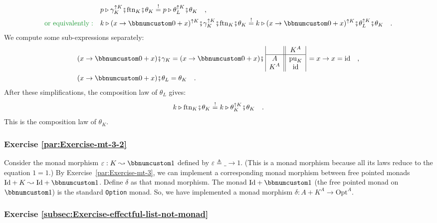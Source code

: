 \begin{align*}
 & p\triangleright\gamma_{K}^{\uparrow K}\bef\text{ftn}_{K}\bef\theta_{K}\overset{!}{=}p\triangleright\theta_{L}^{\uparrow K}\bef\theta_{K}\quad,\\
{\color{greenunder}\text{or equivalently}:}\quad & k\triangleright(x\rightarrow\bbnum 0+x)^{\uparrow K}\bef\gamma_{K}^{\uparrow K}\bef\text{ftn}_{K}\bef\theta_{K}\overset{!}{=}k\triangleright(x\rightarrow\bbnum 0+x)^{\uparrow K}\bef\theta_{L}^{\uparrow K}\bef\theta_{K}\quad.
\end{align*}
We compute some sub-expressions separately:
\begin{align*}
 & (x\rightarrow\bbnum 0+x)\bef\gamma_{K}=(x\rightarrow\bbnum 0+x)\bef\,\begin{array}{|c||c|}
 & K^{A}\\
\hline A & \text{pu}_{K}\\
K^{A} & \text{id}
\end{array}\,=x\rightarrow x=\text{id}\quad,\\
 & (x\rightarrow\bbnum 0+x)\bef\theta_{L}=\theta_{K}\quad.
\end{align*}
After these simplifications, the composition law of $\theta_{L}$
gives:
\[
k\triangleright\text{ftn}_{K}\bef\theta_{K}\overset{!}{=}k\triangleright\theta_{K}^{\uparrow K}\bef\theta_{K}\quad.
\]
This is the composition law of $\theta_{K}$.

\subsubsection*{Exercise \ref{par:Exercise-mt-3-2}}

Consider the monad morphism $\varepsilon:K\leadsto\bbnum 1$ defined
by $\varepsilon\triangleq\_\rightarrow1$. (This is a monad morphism
because all its laws reduce to the equation $1=1$.) By Exercise~\ref{par:Exercise-mt-3},
we can implement a corresponding monad morphism between free pointed
monads $\text{Id}+K\leadsto\text{Id}+\bbnum 1$. Define $\delta$
as that monad morphism. The monad $\text{Id}+\bbnum 1$ (the free
pointed monad on $\bbnum 1$) is the standard \lstinline!Option!
monad. So, we have implemented a monad morphism $\delta:A+K^{A}\rightarrow\text{Opt}^{A}$.

\subsubsection*{Exercise \ref{subsec:Exercise-effectful-list-not-monad}}


